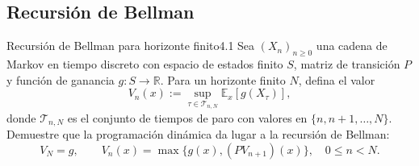 \documentclass[10pt,a4paper]{article}
\begin{document}
\subsection{Recursión de Bellman}

\begin{ejercicio}{Recursión de Bellman para horizonte finito}{4.1}
    Sea $(X_n)_{n\ge 0}$ una cadena de Markov en tiempo discreto con espacio de estados finito $S$, matriz de transición $P$ y función de ganancia $g: S \to \mathbb{R}$. Para un horizonte finito $N$, defina el valor
    \[ V_n(x) := \sup_{\tau \in \mathcal{T}_{n,N}} \mathbb{E}_x[g(X_\tau)], \]
    donde $\mathcal{T}_{n,N}$ es el conjunto de tiempos de paro con valores en $\{n, n+1, \dots, N\}$. Demuestre que la programación dinámica da lugar a la recursión de Bellman:
    \[ V_N = g, \qquad V_n(x) = \max \{g(x), (PV_{n+1})(x)\}, \quad 0 \le n < N. \]
\end{ejercicio}
\end{document}
